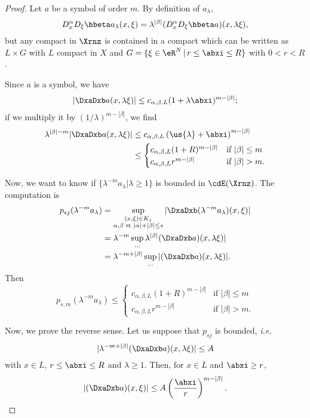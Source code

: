 \begin{proof}
	Let $a$ be a symbol of order $m$. By definition of $a_{\lambda}$,
	\[
		D_x^{\alpha} D_{\xi}\hbeta a_{\lambda}(x,\xi)=\lambda^{|\beta|}(D_x^{\alpha} D_{\xi}\hbeta a)(x,\lambda\xi),
	\]
	but any compact in $\Xrnz$ is contained in a compact which can be written as $L\times G$ with $L$ compact in $X$ and $G=\{\xi\in\eR^N\,|\, r\leq\abxi\leq R\}$ with $0<r<R$.

	Since $a$ is a symbol, we have
	\[
		|\DxaDxb a(x,\lambda\xi)|\leq  c_{\alpha,\beta,L}(1+\lambda\abxi)^{m-|\beta|};
	\]
	if we multiply it by $(1/\lambda)^{m-|\beta|}$, we find
	\begin{equation}
		\begin{split}
			\lambda^{|\beta|-m}|\DxaDxb a(x,\lambda\xi)|
			&\leq c_{\alpha,\beta,L}\left(\us{\lambda}+\abxi\right)^{m-|\beta|}\\
			&\leq \begin{cases}
				c_{\alpha,\beta,L}(1+R)^{m-|\beta|} & \text{if }|\beta|\leq m \\
				c_{\alpha,\beta,L}r^{m-|\beta|}     & \text{if }|\beta|> m.
			\end{cases}
		\end{split}
	\end{equation}

	Now, we want to know if $\{ \lambda^{-m}a_{\lambda}|\lambda\geq 1 \}$ is bounded in $\cdE(\Xrnz)$. The computation is
	\begin{equation}
		\begin{split}
			p_{sj}(\lambda^{-m}a_{\lambda})&=\sup_{ \substack{(x,\xi)\in K_j\\ \alpha,\beta\text{ st } |\alpha|+|\beta|\leq s }}|\DxaDxb(\lambda^{-m}a_{\lambda})(x,\xi)|\\
			&=\lambda^{-m}\sup_{\ldots}\lambda^{|\beta|}(\DxaDxb a)(x,\lambda\xi)|\\
			&=\lambda^{-m+|\beta|}\sup_{\ldots}|(\DxaDxb a)(x,\lambda\xi)|.
		\end{split}
	\end{equation}
	Then
	\begin{equation}
		p_{s,m}(\lambda^{-m} a_{\lambda})\leq \begin{cases}
			c_{\alpha,\beta,L}(1+R)^{m-|\beta|} & \text{if }|\beta|\leq m \\
			c_{\alpha,\beta,L}r^{m-|\beta|}     & \text{if }|\beta|> m.
		\end{cases}
	\end{equation}

	Now, we prove the reverse sense. Let us suppose that $p_{sj}$ is bounded, \emph{i.e.}
	\[
		| \lambda^{-m+|\beta|}(\DxaDxb a)(x,\lambda\xi)|\leq A
	\]
	with $x\in L$, $r\leq\abxi\leq R$ and $\lambda\geq 1$. Then, for $x\in L$ and $\abxi\geq r$,
	\begin{equation}\label{eq:2409r1}
		|(\DxaDxb a)(x,\xi)|\leq A\left(\frac{\abxi}{r}\right)^{m-|\beta|}.
	\end{equation}


\end{proof}
